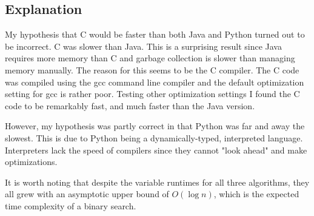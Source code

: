 \documentclass[11pt]{article}
\begin{document}
\subsection*{Explanation}

My hypothesis that C would be faster than both Java and Python turned out to be incorrect. C was slower than Java. This is a surprising result since Java requires more memory than C and garbage collection is slower than managing memory manually. The reason for this seems to be the C compiler. The C code was compiled using the gcc command line compiler and the default optimization setting for gcc is rather poor. Testing other optimization settings I found the C code to be remarkably fast, and much faster than the Java version.

However, my hypothesis was partly correct in that Python was far and away the slowest. This is due to Python being a dynamically-typed, interpreted language. Interpreters lack the speed of compilers since they cannot "look ahead" and make optimizations.

It is worth noting that despite the variable runtimes for all three algorithms, they all grew with an asymptotic upper bound of $O(\log n)$, which is the expected time complexity of a binary search. 
\end{document}
